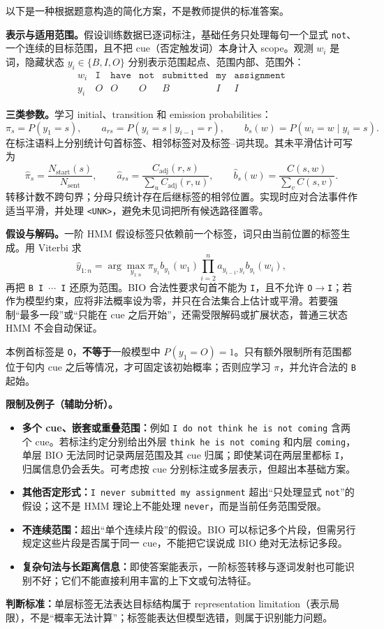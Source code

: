 \begin{checkedsolution}
\nopagebreak[4]
以下是一种根据题意构造的简化方案，不是教师提供的标准答案。

\textbf{表示与适用范围。}假设训练数据已逐词标注，基础任务只处理每句一个显式 \texttt{not}、一个连续的目标范围，且不把 cue（否定触发词）本身计入 scope。观测 $w_i$ 是词，隐藏状态 $y_i\in\{B,I,O\}$ 分别表示范围起点、范围内部、范围外：
\[
\begin{array}{c|cccccc}
w_i&\texttt{I}&\texttt{have}&\texttt{not}&\texttt{submitted}&\texttt{my}&\texttt{assignment}\\\hline
y_i&O&O&O&B&I&I
\end{array}
\]

\textbf{三类参数。}学习 initial、transition 和 emission probabilities：
\[
\pi_s=P(y_1=s),\qquad a_{rs}=P(y_i=s\mid y_{i-1}=r),\qquad b_s(w)=P(w_i=w\mid y_i=s).
\]
在标注语料上分别统计句首标签、相邻标签对及标签--词共现。其未平滑估计可写为
\[
\hat\pi_s=\frac{N_{\mathrm{start}}(s)}{N_{\mathrm{sent}}},\qquad
\hat a_{rs}=\frac{C_{\mathrm{adj}}(r,s)}{\sum_u C_{\mathrm{adj}}(r,u)},\qquad
\hat b_s(w)=\frac{C(s,w)}{\sum_v C(s,v)}.
\]
转移计数不跨句界；分母只统计存在后继标签的相邻位置。实现时应对合法事件作适当平滑，并处理 \texttt{<UNK>}，避免未见词把所有候选路径置零。

\textbf{假设与解码。}一阶 HMM 假设标签只依赖前一个标签，词只由当前位置的标签生成。用 Viterbi 求
\[
\hat y_{1:n}=\arg\max_{y_{1:n}}\pi_{y_1}b_{y_1}(w_1)
\prod_{i=2}^{n}a_{y_{i-1},y_i}b_{y_i}(w_i),
\]
再把 \texttt{B I $\cdots$ I} 还原为范围。BIO 合法性要求句首不能为 \texttt{I}，且不允许 \texttt{O}$\to$\texttt{I}；若作为模型约束，应将非法概率设为零，并只在合法集合上估计或平滑。若要强制“最多一段”或“只能在 cue 之后开始”，还需受限解码或扩展状态，普通三状态 HMM 不会自动保证。

本例首标签是 \texttt{O}，\textbf{不等于}一般模型中 $P(y_1=O)=1$。只有额外限制所有范围都位于句内 cue 之后等情况，才可固定该初始概率；否则应学习 $\pi$，并允许合法的 \texttt{B} 起始。

\textbf{限制及例子（辅助分析）。}
\begin{itemize}
  \item \textbf{多个 cue、嵌套或重叠范围：}例如 \texttt{I do not think he is not coming} 含两个 cue。若标注约定分别给出外层 \texttt{think he is not coming} 和内层 \texttt{coming}，单层 BIO 无法同时记录两层范围及其 cue 归属；即使某词在两层里都标 \texttt{I}，归属信息仍会丢失。可考虑按 cue 分别标注或多层表示，但超出本基础方案。
  \item \textbf{其他否定形式：}\texttt{I never submitted my assignment} 超出“只处理显式 \texttt{not}”的假设；这不是 HMM 理论上不能处理 \texttt{never}，而是当前任务范围受限。
  \item \textbf{不连续范围：}超出“单个连续片段”的假设。BIO 可以标记多个片段，但需另行规定这些片段是否属于同一 cue，不能把它误说成 BIO 绝对无法标记多段。
  \item \textbf{复杂句法与长距离信息：}即使答案能表示，一阶标签转移与逐词发射也可能识别不好；它们不能直接利用丰富的上下文或句法特征。
\end{itemize}
\textbf{判断标准：}单层标签无法表达目标结构属于 representation limitation（表示局限），不是“概率无法计算”；标签能表达但模型选错，则属于识别能力问题。
\end{checkedsolution}
